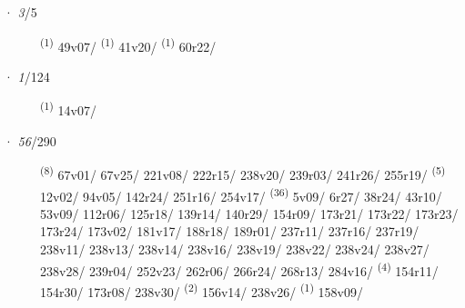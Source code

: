 \noindent{} · \textit{3}/5 \LEMMALINE
\begin{description}
    \item[]  \textsuperscript{(1)} \mbox{49v07/} \CASEBREAK {} \textsuperscript{(1)} \mbox{41v20/} \CASEBREAK {} \textsuperscript{(1)} \mbox{60r22/}
\end{description}
\ENTRYEND
\noindent{} · \textit{1}/124 \LEMMALINE
\begin{description}
    \item[]  \textsuperscript{(1)} \mbox{14v07/}
\end{description}
\ENTRYEND
\noindent{} · \textit{56}/290 \LEMMALINE
\begin{description}
    \item[]  \textsuperscript{(8)} \mbox{67v01/} \mbox{67v25/} \mbox{221v08/} \mbox{222r15/} \mbox{238v20/} \mbox{239r03/} \mbox{241r26/} \mbox{255r19/} \CASEBREAK {} \textsuperscript{(5)} \mbox{12v02/} \mbox{94v05/} \mbox{142r24/} \mbox{251r16/} \mbox{254v17/} \CASEBREAK {} \textsuperscript{(36)} \mbox{5v09/} \mbox{6r27/} \mbox{38r24/} \mbox{43r10/} \mbox{53v09/} \mbox{112r06/} \mbox{125r18/} \mbox{139r14/} \mbox{140r29/} \mbox{154r09/} \mbox{173r21/} \mbox{173r22/} \mbox{173r23/} \mbox{173r24/} \mbox{173v02/} \mbox{181v17/} \mbox{188r18/} \mbox{189r01/} \mbox{237r11/} \mbox{237r16/} \mbox{237r19/} \mbox{238v11/} \mbox{238v13/} \mbox{238v14/} \mbox{238v16/} \mbox{238v19/} \mbox{238v22/} \mbox{238v24/} \mbox{238v27/} \mbox{238v28/} \mbox{239r04/} \mbox{252v23/} \mbox{262r06/} \mbox{266r24/} \mbox{268r13/} \mbox{284v16/} \textsuperscript{(4)} \mbox{154r11/} \mbox{154r30/} \mbox{173r08/} \mbox{238v30/} \textsuperscript{(2)} \mbox{156v14/} \mbox{238v26/} \textsuperscript{(1)} \mbox{158v09/}
\end{description}
